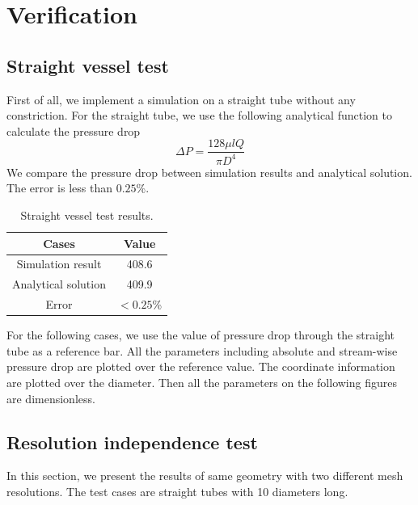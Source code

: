 \section{Verification}
\subsection{Straight vessel test}
First of all, we implement a simulation on a straight tube without any constriction.
For the straight tube, we use the following analytical function to calculate the pressure drop
\begin{equation}
\Delta P  = \frac{128 \mu l Q}{\pi D^4}
\end{equation} 
We compare the pressure drop between simulation results and analytical solution. The error is less than $0.25$\%.

\begin{table}[h]
	\caption{ Straight vessel test results.}
	\vspace{-5pt}
	\begin{center}
		\begin{tabular}{|c|c|}
			\hline
			\textbf{Cases} &\textbf{Value}\\
			\hline
			Simulation result & 408.6 \\
			\hline
			Analytical solution & 409.9 \\
			\hline
			Error & $<0.25$\% \\
			\hline
		\end{tabular}
	\end{center} 
\end{table}

For the following cases, we use the value of pressure drop through the straight tube as a reference bar.
All the parameters including absolute and stream-wise pressure drop are plotted over the reference value.
The coordinate information are plotted over the diameter.
Then all the parameters on the following figures are dimensionless.

\subsection{Resolution independence test}

In this section, we present the results of same geometry with two different mesh resolutions.
The test cases are straight tubes with 10 diameters long. 

